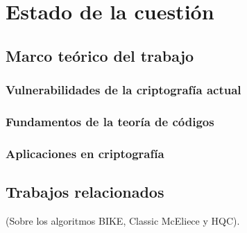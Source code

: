 \chapter{Estado de la cuestión}  

\section{Marco teórico del trabajo}

\subsection{Vulnerabilidades de la criptografía actual}

\subsection{Fundamentos de la teoría de códigos}

\subsection{Aplicaciones en criptografía}

\section{Trabajos relacionados}

(Sobre los algoritmos BIKE, Classic McEliece y HQC).

